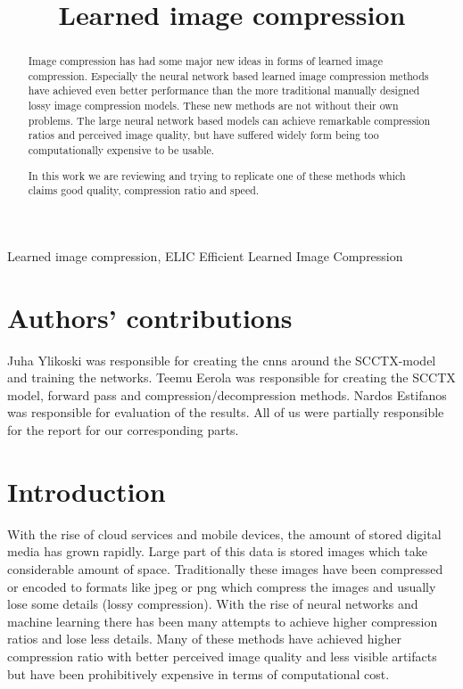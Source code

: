\documentclass{article}
\title{Learned image compression}
\begin{document}
%
\maketitle
%
\begin{abstract}
Image compression has had some major new ideas in forms of learned image compression. 
Especially the neural network based learned image compression methods have achieved even better performance than the more traditional manually designed lossy image compression models.
These new methods are not without their own problems. The large neural network based models can achieve remarkable compression ratios and perceived image quality, but have suffered widely form being too computationally expensive to be usable.

In this work we are reviewing and trying to replicate one of these methods which claims good quality, compression ratio and speed.
\end{abstract}
%
\begin{keywords}
Learned image compression, ELIC Efficient Learned Image Compression
\end{keywords}
%

\setcounter{section}{-1}

\section{Authors' contributions}

Juha Ylikoski was responsible for creating the cnns around the SCCTX-model and training the networks. Teemu Eerola was responsible for creating the SCCTX model, forward pass and compression/decompression methods.
Nardos Estifanos was responsible for evaluation of the results.
All of us were partially responsible for the report for our corresponding parts.

\section{Introduction} %
\label{sec:intro}
With the rise of cloud services and mobile devices, the amount of stored digital media has grown rapidly. 
Large part of this data is stored images which take considerable amount of space.
Traditionally these images have been compressed or encoded to formats like jpeg or png which compress the images and usually lose some details (lossy compression).
With the rise of neural networks and machine learning there has been many attempts to achieve higher compression ratios and lose less details.
Many of these methods have achieved higher compression ratio with better perceived image quality and less visible artifacts but have been prohibitively expensive in terms of computational cost.
\end{document}
